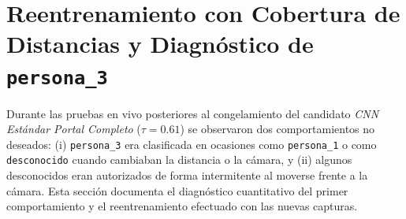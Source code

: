 \documentclass{article}
\begin{document}
\begin{table}[htbp]
\centering
\caption{Fase 2: Comparación de robustez entre el modelo Estándar (0.61) y el modelo Fase 2 Robustez (0.62) sobre Portal (75 intentos) y Sesión 04 (64 intentos).}
\label{tab:fase2_robustez_comparativa}
\small
{}
\end{table}


\section{Reentrenamiento con Cobertura de Distancias y Diagnóstico de \texorpdfstring{\texttt{persona\_3}}{persona_3}}

Durante las pruebas en vivo posteriores al congelamiento del candidato \textit{CNN Estándar Portal Completo} ($\tau = 0.61$) se observaron dos comportamientos no deseados: (i) \texttt{persona\_3} era clasificada en ocasiones como \texttt{persona\_1} o como \texttt{desconocido} cuando cambiaban la distancia o la cámara, y (ii) algunos desconocidos eran autorizados de forma intermitente al moverse frente a la cámara. Esta sección documenta el diagnóstico cuantitativo del primer comportamiento y el reentrenamiento efectuado con las nuevas capturas.
\end{document}
